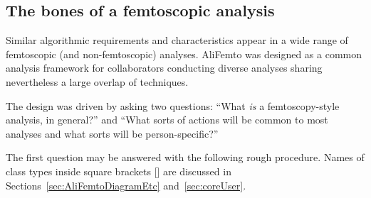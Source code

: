 \documentclass[twoside]{article}
\begin{document}
\subsection{The bones of a femtoscopic analysis}
\label{sec:bones}
Similar algorithmic requirements and characteristics appear in a wide range of femtoscopic (and non-femtoscopic)
analyses.  AliFemto was designed as a common analysis framework for collaborators conducting diverse
analyses sharing nevertheless a large overlap of techniques.

The design was driven by asking two questions: ``What {\it is} a femtoscopy-style analysis, in general?'' and
``What sorts of actions will be common to most analyses and what sorts will be person-specific?''  

The first question may be answered with the following rough procedure.  Names of class types inside square brackets []
are discussed in Sections~\ref{sec:AliFemtoDiagramEtc} and~\ref{sec:coreUser}.
\end{document}
